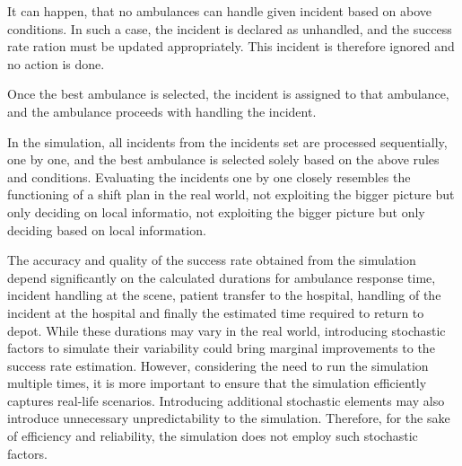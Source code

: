 It can happen, that no ambulances can handle given incident based on above
conditions. In such a case, the incident is declared as unhandled, and the
success rate ration must be updated appropriately. This incident is therefore
ignored and no action is done.

Once the best ambulance is selected, the incident is assigned to that
ambulance, and the ambulance proceeds with handling the incident.

In the simulation, all incidents from the incidents set are processed
sequentially, one by one, and the best ambulance is selected solely based on
the above rules and conditions. Evaluating the incidents one by one closely
resembles the functioning of a shift plan in the real world, not exploiting the
bigger picture but only deciding on local informatio, not exploiting the bigger
picture but only deciding based on local information.

The accuracy and quality of the success rate obtained from the simulation
depend significantly on the calculated durations for ambulance response time,
incident handling at the scene, patient transfer to the hospital, handling of
the incident at the hospital and finally the estimated time required to return
to depot. While these durations may vary in the real world, introducing
stochastic factors to simulate their variability could bring marginal
improvements to the success rate estimation. However, considering the need to
run the simulation multiple times, it is more important to ensure that the
simulation efficiently captures real-life scenarios. Introducing additional
stochastic elements may also introduce unnecessary unpredictability to the
simulation. Therefore, for the sake of efficiency and reliability, the
simulation does not employ such stochastic factors.